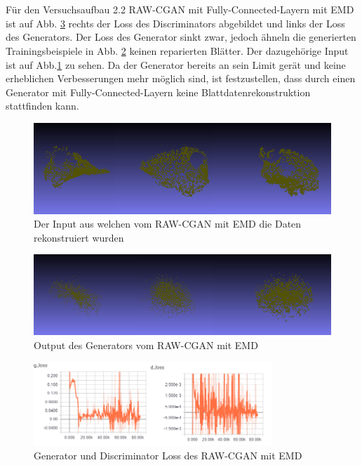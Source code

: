 \documentclass{llncs}
\begin{document}
\newpage
~\\\\
Für den Versuchsaufbau 2.2 RAW-CGAN mit Fully-Connected-Layern mit EMD ist auf Abb. \ref{fig:Bild75} rechts der Loss des Discriminators abgebildet und links der Loss des Generators. Der Loss des Generator sinkt zwar, jedoch ähneln die generierten Trainingsbeispiele in Abb. \ref{fig:Bild77} keinen reparierten Blätter. Der dazugehörige Input ist auf Abb.\ref{fig:Bild76} zu sehen. Da der Generator bereits an sein Limit gerät und keine erheblichen Verbesserungen mehr möglich sind, ist festzustellen, dass durch einen Generator mit Fully-Connected-Layern keine Blattdatenrekonstruktion stattfinden kann.   
\begin{figure}[htbp] 
	\centering
	\includegraphics[width=1.0\textwidth]{reaf_fully_connected_wgan_.png}
	\caption{Der Input aus welchen vom RAW-CGAN mit EMD die Daten rekonstruiert wurden}
	\label{fig:Bild76}
\end{figure}
\begin{figure}[htbp] 
	\centering
	\includegraphics[width=1.0\textwidth]{fake_wgan_fully_rawcgan.png}
	\caption{Output des Generators vom RAW-CGAN mit EMD}
	\label{fig:Bild77}
\end{figure}
\begin{figure}[htbp] 
	\centering
	\includegraphics[width=0.8\textwidth]{wasserstein_fully_connected_rawcgan_loss.png}
	\caption{Generator und Discriminator Loss des RAW-CGAN mit EMD}
	\label{fig:Bild75}
\end{figure}
\end{document}
